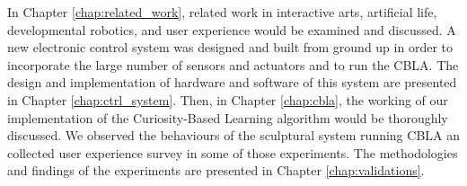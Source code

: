 In Chapter \ref{chap:related_work}, related work in interactive arts, artificial life, developmental robotics, and user experience would be examined and discussed. A new electronic control system was designed and built from ground up in order to incorporate the large number of sensors and actuators and to run the CBLA. The design and implementation of hardware and software of this system are presented in Chapter \ref{chap:ctrl_system}. Then, in Chapter \ref{chap:cbla}, the working of our implementation of the Curiosity-Based Learning algorithm would be thoroughly discussed. We observed the behaviours of the sculptural system running CBLA an collected user experience survey in some of those experiments. The methodologies and findings of the experiments are presented in Chapter \ref{chap:validations}.
